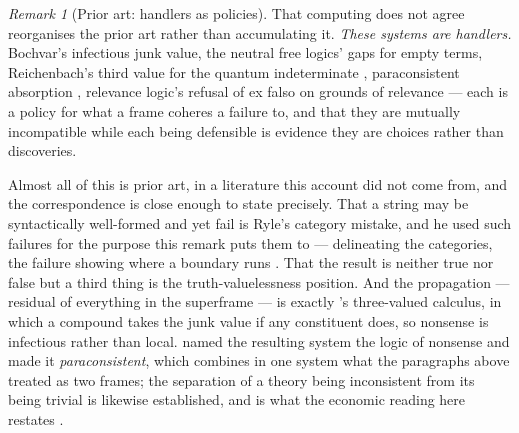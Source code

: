 \documentclass[11pt,a4paper]{article}
\theoremstyle{remark}\newtheorem{remark}[definition]{Remark}
\begin{document}
\begin{remark}[Prior art: handlers as policies]\label{rem:handler-prior-art}
That computing does not agree reorganises the prior art rather than accumulating it. \emph{These systems are handlers.}
Bochvar's infectious junk value, the neutral free logics' gaps for empty terms, Reichenbach's third
value for the quantum indeterminate \citep{reichenbach1944}, paraconsistent absorption
\citep{priest1979}, relevance logic's refusal of ex falso on grounds of relevance
\citep{anderson1975} --- each is a policy for what a frame coheres a failure to, and that they are
mutually incompatible while each being defensible is evidence they are choices rather than discoveries.

Almost all of this is prior art, in a literature this account did not come from, and the correspondence is close enough to state precisely. That a string may be syntactically well-formed and yet
fail is Ryle's category mistake, and he used such failures for the purpose this remark puts them to ---
delineating the categories, the failure showing where a boundary runs \citep{ryle1949}. That the result
is neither true nor false but a third thing is the truth-valuelessness position. And the propagation
--- residual of everything in the superframe --- is exactly \citet{bochvar1938}'s three-valued calculus,
in which a compound takes the junk value if any constituent does, so nonsense is infectious rather than
local. \citet{hallden1949} named the resulting system the logic of nonsense and made it
\emph{paraconsistent}, which combines in one system what the paragraphs above treated as two frames;
the separation of a theory being inconsistent from its being trivial is likewise established, and is
what the economic reading here restates \citep{dacosta1974}.


\end{remark}
\end{document}
